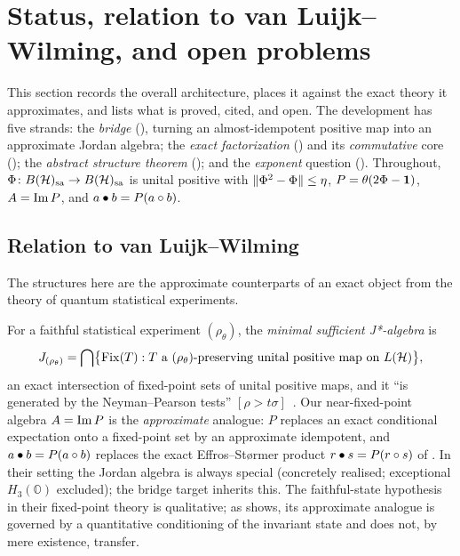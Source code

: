 \section{Status, relation to van Luijk--Wilming, and open problems}
\label{sec:discussion}

This section records the overall architecture, places it against the exact theory
it approximates, and lists what is proved, cited, and open. The development has
five strands: the \emph{bridge} (), turning an almost-idempotent
positive map into an approximate Jordan algebra; the \emph{exact factorization}
() and its \emph{commutative} core
(); the \emph{abstract structure theorem}
(); and the \emph{exponent} question ().
Throughout, $\Phi\colon B(\mathcal{H})_{\mathrm{sa}}\to B(\mathcal{H})_{\mathrm{sa}}$ is unital positive with
$\lVert \Phi^2-\Phi \rVert\le\eta$, $P=\theta(2\Phi-\mathbf{1})$, $A=\operatorname{Im} P$, and
$a\bullet b=P(a\circ b)$.

\subsection{Relation to van Luijk--Wilming}

The structures here are the approximate counterparts of an exact object from the
theory of quantum statistical experiments.

\begin{remark}\label{rem:vlw}
For a faithful statistical experiment $(\rho_\theta)$, the
\emph{minimal sufficient J*-algebra} is
\[
  J_{(\rho_\theta)}=\bigcap\bigl\{\operatorname{Fix}(T):T\text{ a }
  (\rho_\theta)\text{-preserving unital positive map on }L(\mathcal{H})\bigr\},
\]
an exact intersection of fixed-point sets of unital positive maps, and it ``is
generated by the Neyman--Pearson tests'' $[\rho>t\sigma]$~\cite{vanLuijkWilming2026}.
Our near-fixed-point algebra $A=\operatorname{Im} P$ is the \emph{approximate} analogue: $P$
replaces an exact conditional expectation onto a fixed-point set by an approximate
idempotent, and $a\bullet b=P(a\circ b)$ replaces the exact Effros--St\o rmer
product $r\bullet s=P(r\circ s)$ of . In their setting the
Jordan algebra is always special (concretely realised; exceptional
$H_3(\mathbb O)$ excluded); the bridge target inherits this. The faithful-state
hypothesis in their fixed-point theory is qualitative; as 
shows, its approximate analogue is governed by a quantitative conditioning of the
invariant state and does not, by mere existence, transfer.
\end{remark}

